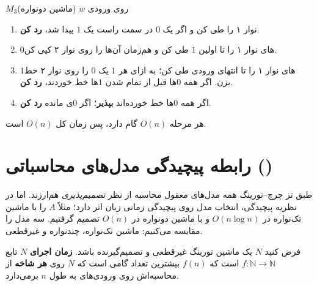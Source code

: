 \begin{example}
\begin{algo}{$M_3$}{روی ورودی $w$ (ماشین دونواره)}
\begin{enumerate}
\item نوار ۱ را طی کن و اگر یک $0$ در سمت راست یک $1$ پیدا شد، \textbf{رد کن}.
\item $0$های نوار ۱ را تا اولین $1$ طی کن و هم‌زمان آن‌ها را روی نوار ۲ کپی کن.
\item $1$های نوار ۱ را تا انتهای ورودی طی کن؛ به ازای هر $1$ یک $0$ را روی نوار ۲ خط بزن. اگر همه $0$ها قبل از تمام شدن $1$ها خط خوردند، \textbf{رد کن}.
\item اگر همه $0$ها خط خورده‌اند \textbf{بپذیر}؛ اگر $0$ی مانده \textbf{رد کن}.
\end{enumerate}
\end{algo}
هر مرحله $O(n)$ گام دارد، پس زمان کل $O(n)$ است.
\end{example}

\section{رابطه پیچیدگی مدل‌های محاسباتی ()}

طبق تز چرچ–تورینگ همه مدل‌های معقول محاسبه از نظر \emph{تصمیم‌پذیری} هم‌ارزند. اما در نظریه پیچیدگی، انتخاب مدل روی پیچیدگی زمانی زبان اثر دارد؛ مثلاً $A$ را با ماشین تک‌نواره در $O(n\log n)$ و با ماشین دونواره در $O(n)$ تصمیم گرفتیم. سه مدل را مقایسه می‌کنیم: ماشین تک‌نواره، چندنواره و غیرقطعی.

\begin{definition}
فرض کنید $N$ یک ماشین تورینگ غیرقطعی و تصمیم‌گیرنده باشد. \textbf{زمان اجرای} $N$ تابع $f:\mathbb{N}\to\mathbb{N}$ است که $f(n)$ بیشترین تعداد گامی است که $N$ روی \textbf{هر شاخه} از محاسبه‌اش روی ورودی‌های به طول $n$ برمی‌دارد.
\end{definition}
\begin{ltrfig}
\end{ltrfig}

